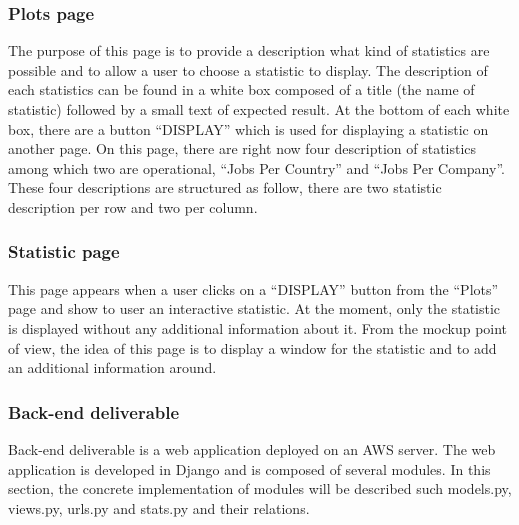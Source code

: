 \documentclass[conference,compsoc]{IEEEtran}
\begin{document}
\subsubsection{Plots page}     
The purpose of this page is to provide a description what kind of statistics are possible and to allow a user to choose a statistic to display. The description of each statistics can be found in a white box composed of a title (the name of statistic) followed by a small text of expected result. At the bottom of each white box, there are a button “DISPLAY” which is used for displaying a statistic on another page.
\newline                  
On this page, there are right now four description of statistics among which two are operational, “Jobs Per Country” and “Jobs Per Company”.  These four descriptions are structured as follow, there are two statistic description per row and two per column.                         

\subsubsection{Statistic page}
This page appears when a user clicks on a “DISPLAY” button from the “Plots” page and show to user an interactive statistic. At the moment, only the statistic is displayed without any additional information about it. From the mockup point of view, the idea of this page is to display a window for the statistic and to add an additional information around.  

\subsubsection{Back-end deliverable}    
Back-end deliverable is a web application deployed on an AWS server. The web application is developed in Django and is composed of several modules. In this section, the concrete implementation of modules will be described such models.py, views.py, urls.py and stats.py and their relations. 
\end{document}
